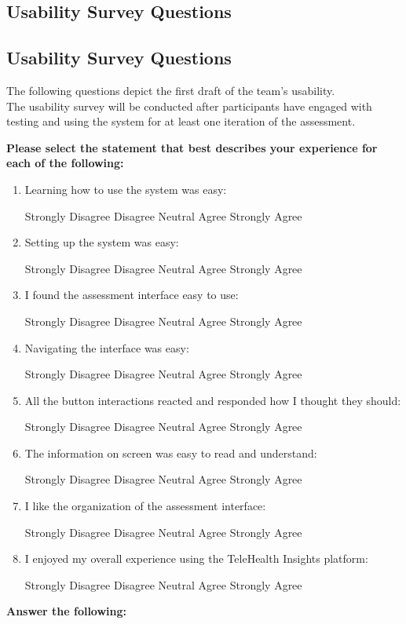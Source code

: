 \documentclass[12pt, titlepage]{article}
\begin{document}
\subsection{Usability Survey Questions}
\subsection{Usability Survey Questions}
The following questions depict the first draft of the team's usability.\\
The usability survey will be conducted after participants have engaged with testing and using the system for at least one iteration of the assessment.\\

\newcommand{\likertScale}{
    \begin{center}
        Strongly Disagree \hfill Disagree \hfill Neutral \hfill Agree \hfill Strongly Agree
    \end{center}
}

\newcommand{\insertAnswerHere}{
  \begin{tcolorbox}[width=0.5\textwidth,
    colframe=black,
    colback=white,
    boxrule=0.1mm,
    sharp corners]
  \textit{Insert answer here...}
  \end{tcolorbox}
}

\textbf{Please select the statement that best describes your experience for each of the following:}
\begin{enumerate}
  \item Learning how to use the system was easy:\likertScale
  \item Setting up the system was easy:\likertScale
  \item I found the assessment interface easy to use:\likertScale
  \item Navigating the interface was easy:\likertScale
  \item All the button interactions reacted and responded how I thought they should:\likertScale
  \item The information on screen was easy to read and understand:\likertScale
  \item I like the organization of the assessment interface:\likertScale
  \item I enjoyed my overall experience using the TeleHealth Insights platform:\likertScale
\end{enumerate}
\textbf{Answer the following:}
\end{document}

